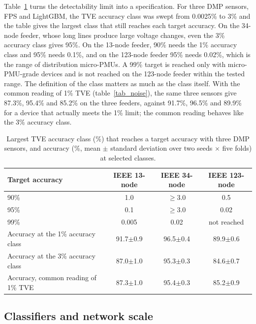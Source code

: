 \documentclass[11pt]{article}
\newenvironment{nw}{}{}
\newcommand{\hlnew}[1]{#1}
\begin{document}
\begin{nw}
Table~\ref{tab_spec} turns the detectability limit into a specification. For three DMP sensors, FPS and LightGBM, the TVE accuracy class was swept from 0.0025\% to 3\% and the table gives the largest class that still reaches each target accuracy. On the 34-node feeder, whose long lines produce large voltage changes, even the 3\% accuracy class gives 95\%. On the 13-node feeder, 90\% needs the 1\% accuracy class and 95\% needs 0.1\%, and on the 123-node feeder 95\% needs 0.02\%, which is the range of distribution micro-PMUs. A 99\% target is reached only with micro-PMU-grade devices and is not reached on the 123-node feeder within the tested range. The definition of the class matters as much as the class itself. With the common reading of 1\% TVE (table~\ref{tab_noise}), the same three sensors give 87.3\%, 95.4\% and 85.2\% on the three feeders, against 91.7\%, 96.5\% and 89.9\% for a device that actually meets the 1\% limit; the common reading behaves like the 3\% accuracy class.
\end{nw}

\begin{table}[!htbp]
\centering
\caption{\hlnew{Largest TVE accuracy class (\%) that reaches a target accuracy with three DMP sensors, and accuracy (\%, mean $\pm$ standard deviation over two seeds $\times$ five folds) at selected classes.}}\label{tab_spec}
\small
\begin{tabular}{lccc}
\toprule
Target accuracy & IEEE 13-node & IEEE 34-node & IEEE 123-node\\
\midrule
90\% & 1.0 & $\geq$3.0 & 0.5\\
95\% & 0.1 & $\geq$3.0 & 0.02\\
99\% & 0.005 & 0.02 & not reached\\
\midrule
Accuracy at the 1\% accuracy class & 91.7$\pm$0.9 & 96.5$\pm$0.4 & 89.9$\pm$0.6\\
Accuracy at the 3\% accuracy class & 87.0$\pm$1.0 & 95.3$\pm$0.3 & 84.6$\pm$0.7\\
Accuracy, common reading of 1\% TVE & 87.3$\pm$1.0 & 95.4$\pm$0.3 & 85.2$\pm$0.9\\
\bottomrule
\end{tabular}
\end{table}

\subsection{Classifiers and network scale}\label{subsec5_6}
\end{document}
